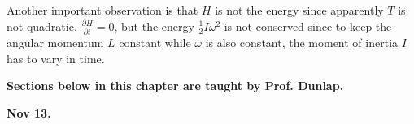 Another important observation is that $H$ is not the energy since
apparently $T$ is not quadratic. $\frac{\partial H}{\partial t}=0$,
but the energy $\frac{1}{2}I\omega^{2}$ is not conserved since to
keep the angular momentum $L$ constant while $\omega$ is also constant,
the moment of inertia $I$ has to vary in time.





\textbf{Sections below in this chapter are taught by Prof. Dunlap. }



\textbf{Nov 13.}





%
%
%
%
%




